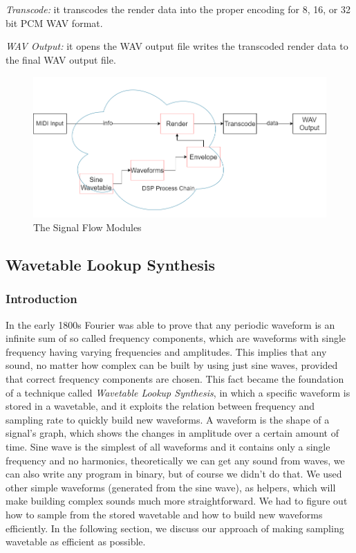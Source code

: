\documentclass[runningheads]{llncs}
\begin{document}
\noindent \textit{Transcode:}
        it transcodes the render data into the proper encoding for 8, 16, or 32 bit PCM WAV format.
        
\noindent \textit{WAV Output:}
        it opens the WAV output file writes the transcoded render data to the final WAV output file.

\begin{figure}[H]
	\includegraphics[width=1.0\textwidth, height=5.4cm]{process.png}
	\caption{The Signal Flow Modules}
	\label{fig:processflowdiagram}
\end{figure}

\subsection{Wavetable Lookup Synthesis} \label{sec:wavetable}

\subsubsection{Introduction}
In the early 1800s Fourier was able to prove that any periodic waveform is an infinite sum of so called frequency components, which are waveforms with single frequency having varying frequencies and amplitudes. This implies that any sound, no matter how complex can be built by using just sine waves, provided that correct frequency components are chosen. This fact became the foundation of a technique called \textit{Wavetable Lookup Synthesis}, in which a specific waveform is stored in a wavetable, and it exploits the relation between frequency and sampling rate to quickly build new waveforms. A waveform \label{waveform} is the shape of a signal's graph, which shows the changes in amplitude over a certain amount of time. Sine wave is the simplest of all waveforms and it contains only a single frequency and no harmonics, theoretically we can get any sound from waves, we can also write any program in binary, but of course we didn't do that. We used other simple waveforms (generated from the sine wave), as helpers, which will make building complex sounds much more straightforward.
We had to figure out how to sample from the stored wavetable and how to build new waveforms efficiently.
In the following section, we discuss our approach of making sampling wavetable as efficient as possible.
\end{document}
